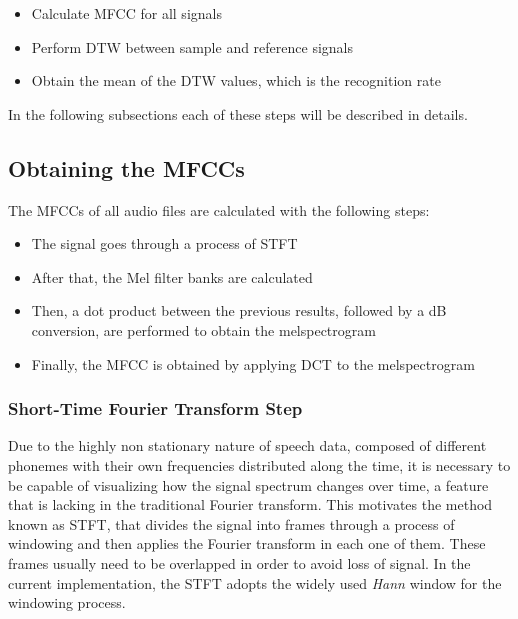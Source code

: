 \documentclass[conference]{IEEEtran}
\begin{document}
\begin{itemize}
    \item Calculate \ac{MFCC} for all signals
    \item Perform \ac{DTW} between sample and reference signals 
    \item Obtain the mean of the \ac{DTW} values, which is the recognition rate
\end{itemize}

In the following subsections each of these steps will be described in details.

\subsection{Obtaining the MFCCs}
 The \acp{MFCC} of all audio files are calculated with the following steps:

\begin{itemize}
    \item The signal goes through a process of \ac{STFT}
    \item After that, the Mel filter banks are calculated
    \item Then, a dot product between the previous results, 
    followed by a dB conversion, are performed to obtain the 
    melspectrogram
    \item Finally, the \ac{MFCC} is obtained by applying \ac{DCT} to the 
    melspectrogram
\end{itemize}

\subsubsection{Short-Time Fourier Transform Step}

Due to the highly non stationary nature of speech data, composed of different 
phonemes with their own frequencies distributed along the time, it is necessary
to be capable of visualizing how the signal spectrum changes over time, a feature 
that is lacking in the traditional Fourier transform. This motivates the method 
known as \ac{STFT}, that divides the signal into frames through a process of 
windowing and then applies the Fourier transform in each one of them. These 
frames usually need to be overlapped in order to avoid loss of signal.
In the current implementation, the \ac{STFT} adopts the widely used 
\textit{Hann} window for the windowing process.
\end{document}

